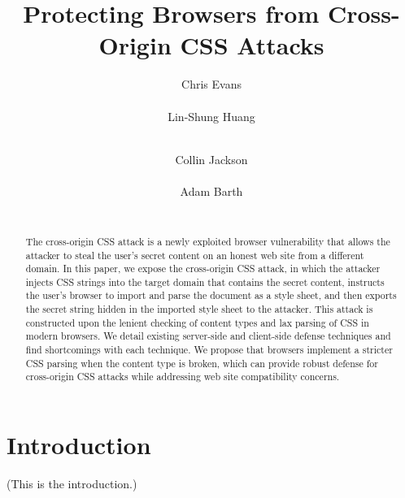 \documentclass{acm_proc_article-sp}
\begin{document}
\title{Protecting Browsers from Cross-Origin CSS Attacks}

\author{
\alignauthor
Chris Evans\\
      \\
\alignauthor
Lin-Shung Huang\\
      \\
\and
\alignauthor
Collin Jackson\\
      \\
\alignauthor
Adam Barth\\
      \\
}

\maketitle
\begin{abstract}
The cross-origin CSS attack is a newly exploited browser vulnerability that allows the attacker to steal the user's secret content on an honest web site from a different domain. In this paper, we expose the cross-origin CSS attack, in which the attacker injects CSS strings into the target domain that contains the secret content, instructs the user's browser to import and parse the document as a style sheet, and then exports the secret string hidden in the imported style sheet to the attacker. This attack is constructed upon the lenient checking of content types and lax parsing of CSS in modern browsers. We detail existing server-side and client-side defense techniques and find shortcomings with each technique. We propose that browsers implement a stricter CSS parsing when the content type is broken, which can provide robust defense for cross-origin CSS attacks while addressing web site compatibility concerns.
\end{abstract}




\section{Introduction}
(This is the introduction.)
\end{document}
